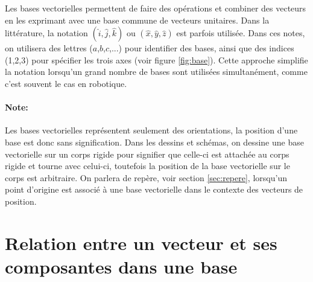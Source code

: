 Les bases vectorielles permettent de faire des opérations et combiner des vecteurs en les exprimant avec une base commune de vecteurs unitaires. Dans la littérature, la notation $(\hat{i},\hat{j},\hat{k})$ ou $(\hat{x},\hat{y},\hat{z})$ est parfois utilisée. Dans ces notes, on utilisera des lettres ($a$,$b$,$c$,...) pour identifier des bases, ainsi que des indices (1,2,3) pour spécifier les trois axes (voir figure \ref{fig:base}). Cette approche simplifie la notation lorsqu'un grand nombre de bases sont utilisées simultanément, comme c'est souvent le cas en robotique.

\paragraph{Note:} Les bases vectorielles représentent seulement des orientations, la position d'une base est donc sans signification. Dans les dessins et schémas, on dessine une base vectorielle sur un corps rigide pour signifier que celle-ci est attachée au corps rigide et tourne avec celui-ci, toutefois la position de la base vectorielle sur le corps est arbitraire. On parlera de repère, voir section \ref{sec:repere}, lorsqu'un point d'origine est associé à une base vectorielle dans le contexte des vecteurs de position. 




\section{Relation entre un vecteur et ses composantes dans une base}

